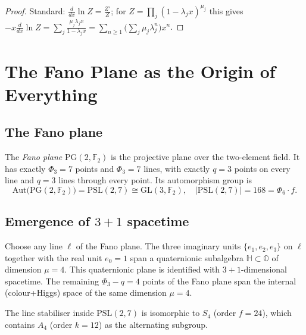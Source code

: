 \begin{proof}
Standard: $\frac{d}{dx}\ln Z = \frac{Z'}{Z}$; for $Z=\prod_j (1-\lambda_j x)^{\mu_j}$ this gives
$-x\frac{d}{dx}\ln Z = \sum_j \frac{\mu_j\lambda_j x}{1-\lambda_j x}
= \sum_{n\geq 1}\bigl(\sum_j \mu_j\lambda_j^n\bigr)x^n$.
\end{proof}

\section{The Fano Plane as the Origin of Everything}
\label{sec:fano}

\subsection{The Fano plane}

The \emph{Fano plane} $\mathrm{PG}(2,\mathbb{F}_2)$ is the projective
plane over the two-element field.  It has exactly $\Phi_3=7$ points
and $\Phi_3=7$ lines, with exactly $q=3$ points on every line and $q=3$
lines through every point.  Its automorphism group is
\begin{equation}
  \label{eq:fano_aut}
  \mathrm{Aut}\!\bigl(\mathrm{PG}(2,\mathbb{F}_2)\bigr)
  = \mathrm{PSL}(2,7) \cong \mathrm{GL}(3,\mathbb{F}_2),
  \quad |\mathrm{PSL}(2,7)| = 168 = \Phi_6\cdot f.
\end{equation}

\subsection{Emergence of $3+1$ spacetime}

\begin{proposition}
\label{prop:fano_spacetime}
Choose any line $\ell$ of the Fano plane.  The three imaginary units
$\{e_1,e_2,e_3\}$ on $\ell$ together with the real unit $e_0 = 1$ span a
quaternionic subalgebra $\mathbb{H}\subset\mathbb{O}$ of dimension $\mu=4$.
This quaternionic plane is identified with $3+1$-dimensional spacetime.
The remaining $\Phi_3 - q = 4$ points of the Fano plane span the
internal (colour+Higgs) space of the same dimension $\mu=4$.
\end{proposition}

The line stabiliser inside $\mathrm{PSL}(2,7)$ is isomorphic to $S_4$
(order $f=24$), which contains $A_4$ (order $k=12$) as the alternating
subgroup.

